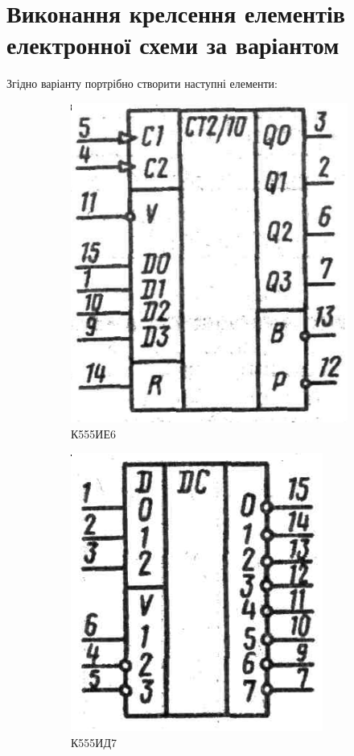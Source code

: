 \section{Виконання крелсення елементів електронної схеми за варіантом}

Згідно варіанту портрібно створити наступні елементи:
\begin{figure}[!htb]
  \begin{subfigure}[b]{.4\linewidth}
    \centering \includegraphics[width=.8\linewidth]{./images/lab2/target_element1.png}
    \caption{К555ИЕ6}
    \label{fig:lab2:target_element1}
  \end{subfigure}
  \hfill
  \begin{subfigure}[b]{.4\linewidth}
    \centering \includegraphics[width=.8\linewidth]{./images/lab2/target_element2.png}
    \caption{К555ИД7}
    \label{fig:lab2:target_element2}
  \end{subfigure}
  \caption{\label{fig:lab2:target_elements}}
\end{figure}
\FloatBarrier

